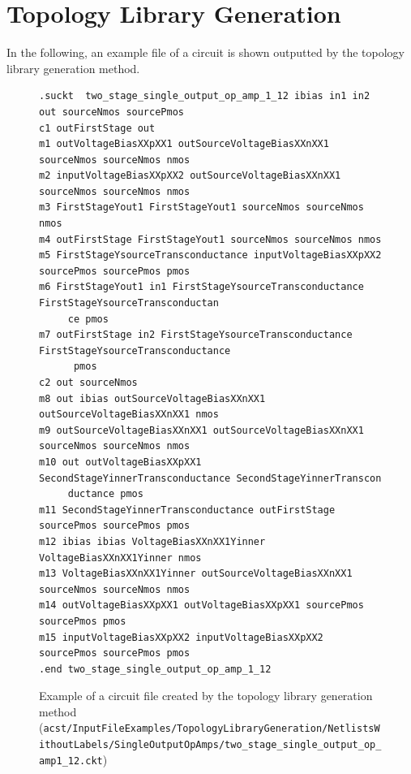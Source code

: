 \section{Topology Library  Generation}\label{sec:OutputFileTopologyLibraryGeneration}
In the following, an example file of a circuit is shown outputted by the topology library generation method.
\begin{figure}[H]
	\begin{lstlisting}[basicstyle=\ttfamily\scriptsize,backgroundcolor={\color{gray!30}}, escapechar=? ]
.suckt  two_stage_single_output_op_amp_1_12 ibias in1 in2 out sourceNmos sourcePmos
c1 outFirstStage out 
m1 outVoltageBiasXXpXX1 outSourceVoltageBiasXXnXX1 sourceNmos sourceNmos nmos
m2 inputVoltageBiasXXpXX2 outSourceVoltageBiasXXnXX1 sourceNmos sourceNmos nmos
m3 FirstStageYout1 FirstStageYout1 sourceNmos sourceNmos nmos
m4 outFirstStage FirstStageYout1 sourceNmos sourceNmos nmos
m5 FirstStageYsourceTransconductance inputVoltageBiasXXpXX2 sourcePmos sourcePmos pmos
m6 FirstStageYout1 in1 FirstStageYsourceTransconductance FirstStageYsourceTransconductan
     ce pmos
m7 outFirstStage in2 FirstStageYsourceTransconductance FirstStageYsourceTransconductance
      pmos
c2 out sourceNmos 
m8 out ibias outSourceVoltageBiasXXnXX1 outSourceVoltageBiasXXnXX1 nmos
m9 outSourceVoltageBiasXXnXX1 outSourceVoltageBiasXXnXX1 sourceNmos sourceNmos nmos
m10 out outVoltageBiasXXpXX1 SecondStageYinnerTransconductance SecondStageYinnerTranscon
     ductance pmos
m11 SecondStageYinnerTransconductance outFirstStage sourcePmos sourcePmos pmos
m12 ibias ibias VoltageBiasXXnXX1Yinner VoltageBiasXXnXX1Yinner nmos
m13 VoltageBiasXXnXX1Yinner outSourceVoltageBiasXXnXX1 sourceNmos sourceNmos nmos
m14 outVoltageBiasXXpXX1 outVoltageBiasXXpXX1 sourcePmos sourcePmos pmos
m15 inputVoltageBiasXXpXX2 inputVoltageBiasXXpXX2 sourcePmos sourcePmos pmos
.end two_stage_single_output_op_amp_1_12
\end{lstlisting}
	\caption{Example of a circuit file created by the topology library generation method ({\tt acst/InputFileExamples/TopologyLibraryGeneration/NetlistsWithout\protect \linebreak Labels/Single\-OutputOpAmps/two\_stage\_single\_output\_op\_amp1\_12.ckt})}
\end{figure}

